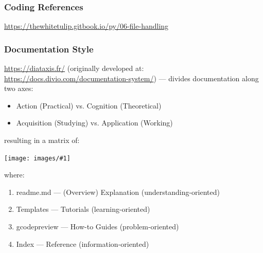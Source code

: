 \documentclass{ltxdoc}
\newcommand{\includeimage}[1]{\bigskip\noindent\texttt{[image: images/\#1]}\bigskip}
\begin{document}
%
%
%
%

\subsubsection{Coding References}

\url{https://thewhitetulip.gitbook.io/py/06-file-handling}

\subsubsection{Documentation Style}
 
\url{https://diataxis.fr/} (originally developed at: \url{https://docs.divio.com/documentation-system/}) --- divides documentation along two axes:

\begin{itemize}
\item Action (Practical) vs. Cognition (Theoretical)
\item Acquisition (Studying) vs. Application (Working)
\end{itemize}

\noindent resulting in a matrix of:

\includeimage{diataxis_overview.png}

\noindent where:

\begin{enumerate}
\item readme.md --- (Overview) Explanation (understanding-oriented) %
\item Templates --- Tutorials (learning-oriented)
\item gcodepreview --- How-to Guides (problem-oriented)
\item Index --- Reference (information-oriented)
\end{enumerate}
\end{document}
